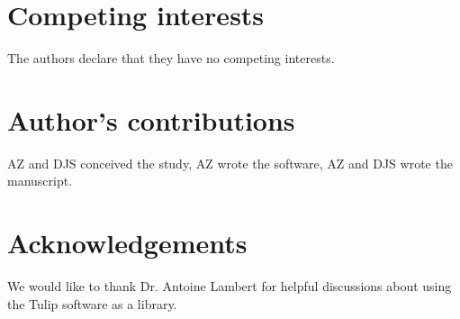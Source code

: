 \documentclass{bmcart}
\begin{document}
\begin{backmatter}

\section*{Competing interests}
The authors declare that they have no competing interests.

\section*{Author's contributions}
AZ and DJS conceived the study, AZ wrote the software, AZ and DJS wrote the manuscript.

\section*{Acknowledgements}
We would like to thank Dr. Antoine Lambert for helpful discussions about using the Tulip software as a library.






\end{backmatter}
\end{document}

